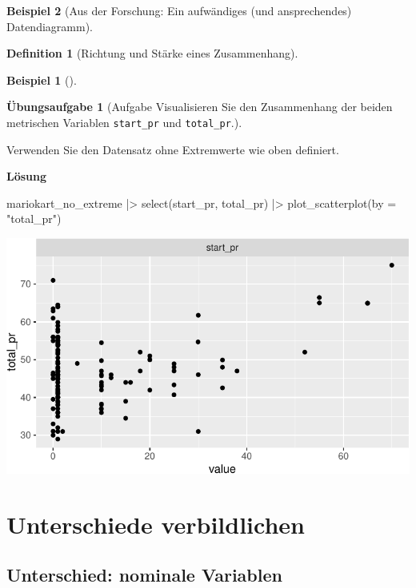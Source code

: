 \documentclass[
  a4paper,
]{scrbook}
\newenvironment{Shaded}{\begin{snugshade}}{\end{snugshade}}
\newcommand{\AttributeTok}[1]{\textcolor[rgb]{0.40,0.45,0.13}{#1}}
\newcommand{\FunctionTok}[1]{\textcolor[rgb]{0.28,0.35,0.67}{#1}}
\newcommand{\NormalTok}[1]{\textcolor[rgb]{0.00,0.23,0.31}{#1}}
\newcommand{\SpecialCharTok}[1]{\textcolor[rgb]{0.37,0.37,0.37}{#1}}
\newcommand{\StringTok}[1]{\textcolor[rgb]{0.13,0.47,0.30}{#1}}
\theoremstyle{definition}
\newtheorem{example}{Beispiel}[chapter]
\theoremstyle{definition}
\newtheorem{definition}{Definition}[chapter]
\theoremstyle{definition}
\newtheorem{exercise}{Übungsaufgabe}[chapter]
\theoremstyle{remark}
\begin{document}
\begin{example}[Aus der Forschung: Ein aufwändiges (und ansprechendes)
Datendiagramm]
\begin{definition}[Richtung und Stärke eines
Zusammenhang]
\begin{example}[]
\end{example}

\begin{exercise}[Aufgabe Visualisieren Sie den Zusammenhang der beiden
metrischen Variablen \texttt{start\_pr} und
\texttt{total\_pr}.]\protect\hypertarget{exr-zsmnhang-metrisch}{}\label{exr-zsmnhang-metrisch}

Verwenden Sie den Datensatz ohne Extremwerte wie oben definiert.

\textbf{Lösung}

\begin{Shaded}
\begin{Highlighting}[]
\NormalTok{mariokart\_no\_extreme }\SpecialCharTok{|\textgreater{}} 
  \FunctionTok{select}\NormalTok{(start\_pr, total\_pr) }\SpecialCharTok{|\textgreater{}} 
  \FunctionTok{plot\_scatterplot}\NormalTok{(}\AttributeTok{by =} \StringTok{"total\_pr"}\NormalTok{)}
\end{Highlighting}
\end{Shaded}

\includegraphics{040-verbildlichen_files/figure-pdf/unnamed-chunk-34-1.pdf}

\end{exercise}

\section{Unterschiede verbildlichen}\label{unterschiede-verbildlichen}

\subsection{Unterschied: nominale
Variablen}\label{unterschied-nominale-variablen}


\end{definition}
\end{example}
\end{document}
